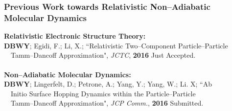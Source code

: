 \documentclass[usepdftitle=false,10pt]{beamer}
\begin{document}
\begin{frame}
  \frametitle{Previous Work towards Relativistic Non--Adiabatic Molecular Dynamics}

  {\Large \bf Relativistic Electronic Structure Theory:}\vspace{0.1cm}\\

  \textbf{DBWY}; Egidi, F.; Li, X.; ``Relativistic Two--Component Particle--Particle
    \\$\quad$Tamm--Dancoff Approximation", \emph{JCTC}, \textbf{2016} Just Accepted.\\

  ~\\
  {\Large \bf Non--Adiabatic Molecular Dynamics:}\vspace{0.1cm}\\

  \textbf{DBWY}; Lingerfelt, D.; Petrone, A.; Yang, Y.; Yang, W.; Li. X;
    ``Ab \\$\quad$Initio Surface Hopping Dynamics within the Particle--Particle
    \\$\quad$Tamm--Dancoff Approximation", \emph{JCP Comm.}, \textbf{2016} Submitted.\\

\end{frame}
\end{document}
